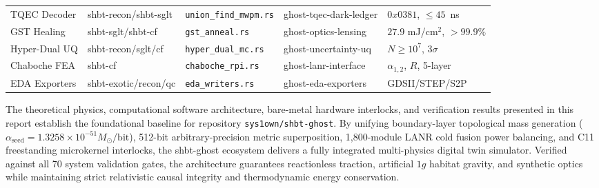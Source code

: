 \documentclass[twocolumn,aps,pra,floatfix,superscriptaddress,10pt]{revtex4-2}
\begin{document}
\begin{table}[t]
\begin{ruledtabular}
\begin{tabular}{lllll}
TQEC Decoder & shbt-recon/shbt-sglt & \texttt{union\_find\_mwpm.rs} & ghost-tqec-dark-ledger & $0x0381$, $\le 45$~ns \\
GST Healing & shbt-sglt/shbt-cf & \texttt{gst\_anneal.rs} & ghost-optics-lensing & $27.9$ mJ/cm$^2$, $>99.9\%$ \\
Hyper-Dual UQ & shbt-recon/sglt/cf & \texttt{hyper\_dual\_mc.rs} & ghost-uncertainty-uq & $N \ge 10^7$, $3\sigma$ \\
Chaboche FEA & shbt-cf & \texttt{chaboche\_rpi.rs} & ghost-lanr-interface & $\alpha_{1,2}$, $R$, 5-layer \\
EDA Exporters & shbt-exotic/recon/qc & \texttt{eda\_writers.rs} & ghost-eda-exporters & GDSII/STEP/S2P \\
\end{tabular}
\end{ruledtabular}
\end{table}

The theoretical physics, computational software architecture, bare-metal hardware interlocks, and verification results presented in this report establish the foundational baseline for repository \texttt{sys1own/shbt-ghost}. By unifying boundary-layer topological mass generation ($\alpha_{\text{seed}} = 1.3258 \times 10^{-51} M_\odot/\text{bit}$), 512-bit arbitrary-precision metric superposition, 1,800-module LANR cold fusion power balancing, and C11 freestanding microkernel interlocks, the shbt-ghost ecosystem delivers a fully integrated multi-physics digital twin simulator. Verified against all 70 system validation gates, the architecture guarantees reactionless traction, artificial $1g$ habitat gravity, and synthetic optics while maintaining strict relativistic causal integrity and thermodynamic energy conservation.
\end{document}
